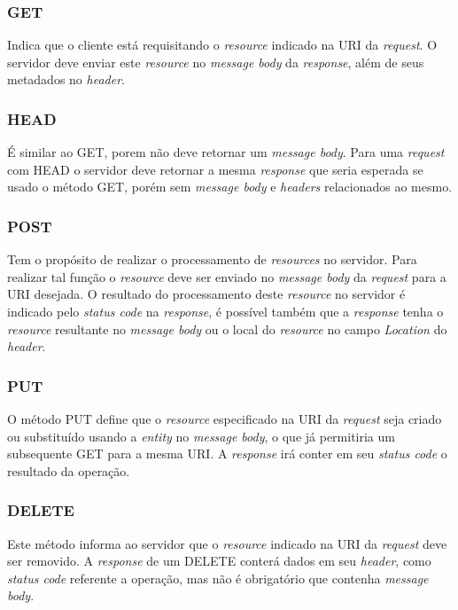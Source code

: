 \subsubsection{GET}
Indica que o cliente está requisitando o \textit{resource} indicado na URI da \textit{request}. O servidor deve enviar este \textit{resource} no \textit{message body} da \textit{response}, além de seus metadados no \textit{header}.

\subsubsection{HEAD}
É similar ao GET, porem não deve retornar um \textit{message body}. Para uma \textit{request} com HEAD o servidor deve retornar a mesma \textit{response} que seria esperada se usado o método GET, porém sem \textit{message body} e \textit{headers} relacionados ao mesmo.

\subsubsection{POST}
Tem o propósito de realizar o processamento de \textit{resources} no servidor. Para realizar tal função o \textit{resource} deve ser enviado no \textit{message body} da \textit{request} para a URI desejada. O resultado do processamento deste \textit{resource} no servidor é indicado pelo \textit{status code} na \textit{response}, é possível também que a \textit{response} tenha o \textit{resource} resultante no \textit{message body} ou o local do \textit{resource} no campo \textit{Location} do \textit{header}.

\subsubsection{PUT}
O método PUT define que o \textit{resource} especificado na URI da \textit{request} seja criado ou substituído usando a \textit{entity} no \textit{message body}, o que já permitiria um subsequente GET para a mesma URI. A \textit{response} irá conter em seu \textit{status code} o resultado da operação. 

\subsubsection{DELETE}
Este método informa ao servidor que o \textit{resource} indicado na URI da \textit{request} deve ser removido. A \textit{response} de um DELETE conterá dados em seu \textit{header}, como \textit{status code} referente a operação, mas não é obrigatório que contenha \textit{message body}.


